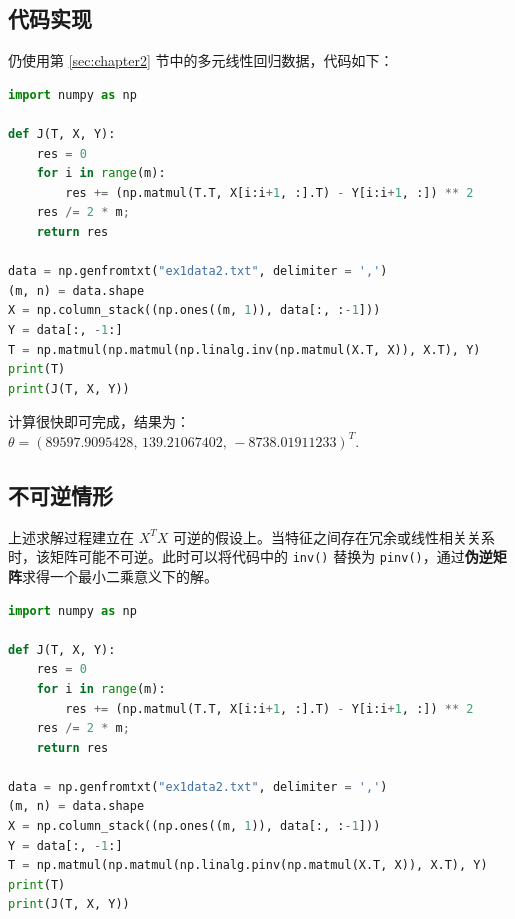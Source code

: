 \subsection{代码实现}

仍使用第 \ref{sec:chapter2} 节中的多元线性回归数据，代码如下：

\begin{lstlisting}[language=Python]
import numpy as np

def J(T, X, Y):
	res = 0
	for i in range(m):
		res += (np.matmul(T.T, X[i:i+1, :].T) - Y[i:i+1, :]) ** 2
	res /= 2 * m;
	return res

data = np.genfromtxt("ex1data2.txt", delimiter = ',')
(m, n) = data.shape
X = np.column_stack((np.ones((m, 1)), data[:, :-1]))
Y = data[:, -1:]
T = np.matmul(np.matmul(np.linalg.inv(np.matmul(X.T, X)), X.T), Y)
print(T)
print(J(T, X, Y))
\end{lstlisting}

计算很快即可完成，结果为：$\theta=(89597.9095428,\,139.21067402,\,-8738.01911233)^T$.


\subsection{不可逆情形}

上述求解过程建立在 $X^TX$ 可逆的假设上。当特征之间存在冗余或线性相关关系时，该矩阵可能不可逆。此时可以将代码中的 \texttt{inv()} 替换为 \texttt{pinv()}，通过\textbf{伪逆矩阵}求得一个最小二乘意义下的解。

\begin{lstlisting}[language=Python]
import numpy as np

def J(T, X, Y):
	res = 0
	for i in range(m):
		res += (np.matmul(T.T, X[i:i+1, :].T) - Y[i:i+1, :]) ** 2
	res /= 2 * m;
	return res

data = np.genfromtxt("ex1data2.txt", delimiter = ',')
(m, n) = data.shape
X = np.column_stack((np.ones((m, 1)), data[:, :-1]))
Y = data[:, -1:]
T = np.matmul(np.matmul(np.linalg.pinv(np.matmul(X.T, X)), X.T), Y)
print(T)
print(J(T, X, Y))
\end{lstlisting}
